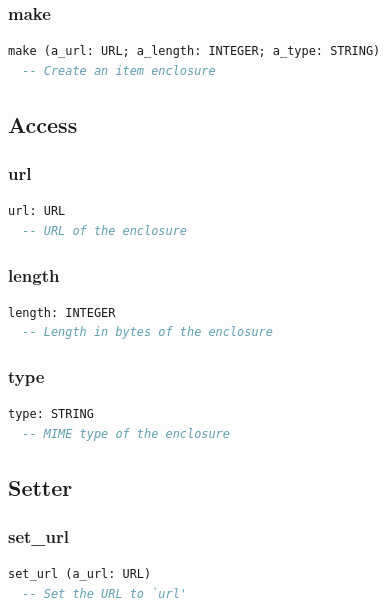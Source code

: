 \subsubsection{make}

\begin{lstlisting}[language=Eiffel]
make (a_url: URL; a_length: INTEGER; a_type: STRING)
  -- Create an item enclosure
\end{lstlisting}

\subsection{Access}
\label{sec:item-enclosure-access}

\subsubsection{url}

\begin{lstlisting}[language=Eiffel]
url: URL
  -- URL of the enclosure
\end{lstlisting}

\subsubsection{length}

\begin{lstlisting}[language=Eiffel]
length: INTEGER
  -- Length in bytes of the enclosure
\end{lstlisting}

\subsubsection{type}

\begin{lstlisting}[language=Eiffel]
type: STRING
  -- MIME type of the enclosure
\end{lstlisting}

\subsection{Setter}
\label{sec:item-enclosure-setter}

\subsubsection{set\_url}

\begin{lstlisting}[language=Eiffel]
set_url (a_url: URL)
  -- Set the URL to `url'
\end{lstlisting}

